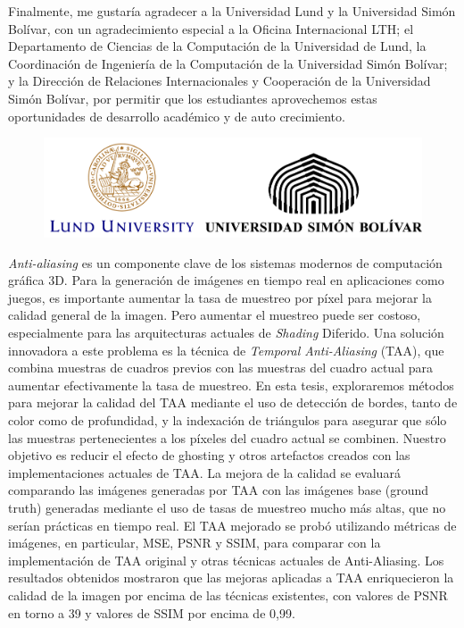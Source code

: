 \documentclass[pregrado]{tesis-usb} %
\begin{document}
Finalmente, me gustaría agradecer a la Universidad Lund y la Universidad Simón Bolívar, con un agradecimiento especial a la Oficina Internacional LTH; el Departamento de Ciencias de la Computación de la Universidad de Lund, la Coordinación de Ingeniería de la Computación de la Universidad Simón Bolívar; y la Dirección de Relaciones Internacionales y Cooperación de la Universidad Simón Bolívar, por permitir que los estudiantes aprovechemos estas oportunidades de desarrollo académico y de auto crecimiento.

\begin{figure}[!hbt]
	\centering
	\includegraphics[scale=0.3]{images/univ_logotypes.png}
\end{figure}

\begin{resumen}
	\textit{Anti-aliasing} es un componente clave de los sistemas modernos de computación gráfica 3D. Para la generación de imágenes en tiempo real en aplicaciones como juegos, es importante aumentar la tasa de muestreo por píxel para mejorar la calidad general de la imagen. Pero aumentar el muestreo puede ser costoso, especialmente para las arquitecturas actuales de \textit{Shading} Diferido. Una solución innovadora a este problema es la técnica de \textit{Temporal Anti-Aliasing} (TAA), que combina muestras de cuadros previos con las muestras del cuadro actual para aumentar efectivamente la tasa de muestreo. En esta tesis, exploraremos métodos para mejorar la calidad del TAA mediante el uso de detección de bordes, tanto de color como de profundidad, y la indexación de triángulos para asegurar que sólo las muestras pertenecientes a los píxeles del cuadro actual se combinen. Nuestro objetivo es reducir el efecto de ghosting y otros artefactos creados con las implementaciones actuales de TAA. La mejora de la calidad se evaluará comparando las imágenes generadas por TAA con las imágenes base (ground truth) generadas mediante el uso de tasas de muestreo mucho más altas, que no serían prácticas en tiempo real. El TAA mejorado se probó utilizando métricas de imágenes, en particular, MSE, PSNR y SSIM, para comparar con la implementación de TAA original y otras técnicas actuales de Anti-Aliasing. Los resultados obtenidos mostraron que las mejoras aplicadas a TAA enriquecieron la calidad de la imagen por encima de las técnicas existentes, con valores de PSNR en torno a 39 y valores de SSIM por encima de 0,99. \\
	\vspace{2cm}\par{}
\end{resumen}
\end{document}
